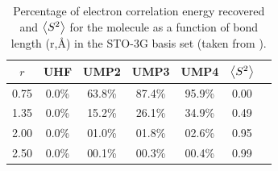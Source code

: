 \documentclass[11pt,a4paper]{article}
\begin{document}
\begin{table}[h!]
    \centering
    \caption{\centering Percentage of electron correlation energy recovered and $\expval{S^2}$ for the  molecule as a function of bond length (r,\si{\angstrom}) in the STO-3G basis set (taken from \cite{Gill_1988}).}
    \begin{tabular}{c c c c c c c}
\hline
 $r$ & UHF & UMP2 & UMP3 & UMP4 & $\expval{S^2}$ \\
\hline
0.75 & 0.0\% & 63.8\% & 87.4\% & 95.9\% & 0.00\\
1.35 & 0.0\% & 15.2\% & 26.1\% & 34.9\% & 0.49\\
2.00 & 0.0\% & 01.0\% & 01.8\% & 02.6\% & 0.95\\
2.50 & 0.0\% & 00.1\% & 00.3\% & 00.4\% & 0.99\\
\hline
\end{tabular}
    \label{tab:SpinContamination}
\end{table}
\end{document}
